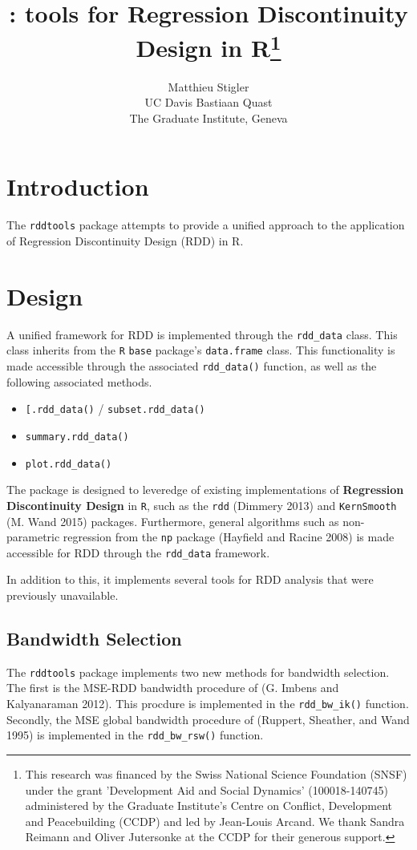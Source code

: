 \documentclass[article]{jss}
\author{
Matthieu Stigler\\UC Davis \And Bastiaan Quast\\The Graduate Institute, Geneva
}
\title{\pkg{rddtools}: tools for Regression Discontinuity Design in
R\thanks{This research was financed by the Swiss National Science Foundation (SNSF) under the grant 'Development Aid and Social Dynamics' (100018-140745) administered by the Graduate Institute's Centre on Conflict, Development and Peacebuilding (CCDP) and led by Jean-Louis Arcand. We thank Sandra Reimann and Oliver Jutersonke at the CCDP for their generous support.}}
\begin{document}
\section{Introduction}\label{introduction}

The \texttt{rddtools} package attempts to provide a unified approach to
the application of Regression Discontinuity Design (RDD) in R.

\section{Design}\label{design}

A unified framework for RDD is implemented through the
\texttt{rdd\_data} class. This class inherits from the \texttt{R}
\texttt{base} package's \texttt{data.frame} class. This functionality is
made accessible through the associated \texttt{rdd\_data()} function, as
well as the following associated methods.

\begin{itemize}
\itemsep1pt\parskip0pt
\item
  \texttt{{[}.rdd\_data()} / \texttt{subset.rdd\_data()}
\item
  \texttt{summary.rdd\_data()}
\item
  \texttt{plot.rdd\_data()}
\end{itemize}

The package is designed to leveredge of existing implementations of
\textbf{Regression Discontinuity Design} in \texttt{R}, such as the
\texttt{rdd} (Dimmery 2013) and \texttt{KernSmooth} (M. Wand 2015)
packages. Furthermore, general algorithms such as non-parametric
regression from the \texttt{np} package (Hayfield and Racine 2008) is
made accessible for RDD through the \texttt{rdd\_data} framework.

In addition to this, it implements several tools for RDD analysis that
were previously unavailable.

\subsection{Bandwidth Selection}\label{bandwidth-selection}

The \texttt{rddtools} package implements two new methods for bandwidth
selection. The first is the MSE-RDD bandwidth procedure of (G. Imbens
and Kalyanaraman 2012). This procdure is implemented in the
\texttt{rdd\_bw\_ik()} function. Secondly, the MSE global bandwidth
procedure of (Ruppert, Sheather, and Wand 1995) is implemented in the
\texttt{rdd\_bw\_rsw()} function.
\end{document}
